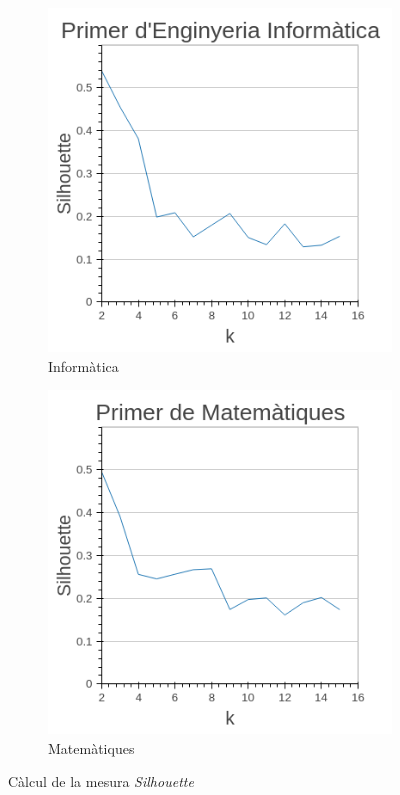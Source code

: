 \documentclass[12pt,a4paper,catalan]{article}
\begin{document}
\begin{figure}[h]
\centering
\begin{subfigure}{.45\textwidth}
  \centering
  \includegraphics[width=\linewidth]{img/silhouette_primer_info.png}
  \caption{Informàtica}
\end{subfigure}
\begin{subfigure}{.45\textwidth}
  \centering
  \includegraphics[width=\linewidth]{img/silhouette_primer_mates.png}
  \caption{Matemàtiques}
\end{subfigure}
\caption{Càlcul de la mesura \textit{Silhouette}}
\end{figure}
\end{document}
